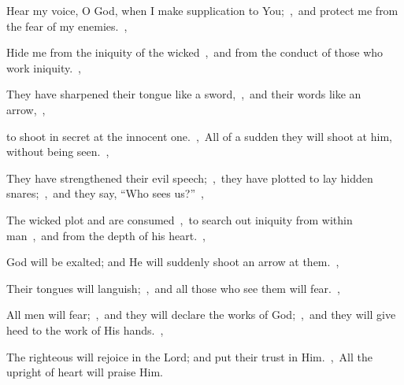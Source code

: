 \documentclass[12pt,twoside,a5paper]{article}
\begin{document}
\begin{normalparskip}
  Hear my voice, O God, when I make supplication to You;~\sep\ and protect me from the fear of my enemies.~\sep


  Hide me from the iniquity of the wicked~\sep\ and from the conduct of those who work iniquity.~\sep

  They have sharpened their tongue like a sword,~\sep\ and their words like an arrow,~\sep

  to shoot in secret at the innocent one.~\sep\ All of a sudden they will shoot at him, without being seen.~\sep

  They have strengthened their evil speech;~\sep\ they have plotted to lay hidden snares;~\sep\ and they say, ``Who sees us?''~\sep

  The wicked plot and are consumed~\sep\ to search out iniquity from within man~\sep\ and from the depth of his heart.~\sep

  God will be exalted; and He will suddenly shoot an arrow at them.~\sep

  Their tongues will languish;~\sep\ and all those who see them will fear.~\sep

  All men will fear;~\sep\ and they will declare the works of God;~\sep\ and they will give heed to the work of His hands.~\sep

  The righteous will rejoice in the Lord; and put their trust in Him.~\sep\ All the upright of heart will praise Him.
\end{normalparskip}



\end{document}
